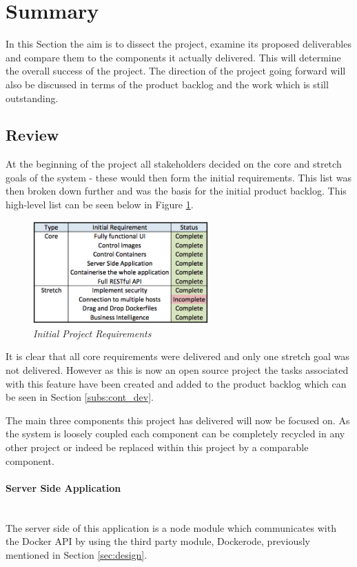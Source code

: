 \section{Summary}
\label{sec:summary}
In this Section the aim is to dissect the project, examine its proposed deliverables and compare them to the components it actually delivered. This will determine the overall success of the project. The direction of the project going forward will also be discussed in terms of the product backlog and the work which is still outstanding.

\subsection{Review}
At the beginning of the project all stakeholders decided on the core and stretch goals of the system - these would then form the initial requirements. This list was then broken down further and was the basis for the initial product backlog. This high-level list can be seen below in Figure \ref{fig:requirements}.

\begin{figure}[!ht]
\centering
\includegraphics*[width=0.6\textwidth]{images/requirements}
\caption{\em Initial Project Requirements}
\label{fig:requirements}
\end{figure}

It is clear that all core requirements were delivered and only one stretch goal was not delivered. However as this is now an open source project the tasks associated with this feature have been created and added to the product \gls{backlog} which can be seen in Section \ref{subs:cont_dev}.

The main three components this project has delivered will now be focused on. As the system is loosely coupled each component can be completely recycled in any other project or indeed be replaced within this project by a comparable component.

\paragraph{Server Side Application}\mbox{}\\
The server side of this application is a node module which communicates with the Docker API by using the third party module, Dockerode, previously mentioned in Section \ref{sec:design}.

